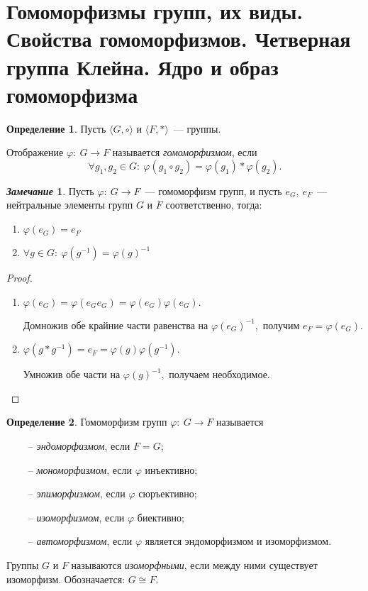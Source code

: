 \documentclass[a4paper, 14pt]{extarticle}
\newcommand{\n}{\par}
\renewcommand{\phi}{\varphi}
\theoremstyle{definition}
\newtheorem*{remark}{\textit{Замечание}}
\newtheorem{definition}{Определение}
\theoremstyle{plain}
\numberwithin{theorem}{section}
\numberwithin{definition}{section}
\numberwithin{statement}{section}
\numberwithin{lemma}{section}
\numberwithin{consequence}{section}
\begin{document}
	\section{Гомоморфизмы групп, их виды. Свойства гомоморфизмов. Четверная группа Клейна. Ядро и образ гомоморфизма}
	\setcounter{definition}{0}
	\begin{definition}
		Пусть $\langle G, \circ \rangle$ и $\langle F, * \rangle$~--- группы.
		\n
		Отображение $\phi{:} \ G \rightarrow F$ называется \textit{гомоморфизмом}, если
		\begin{equation*}
			\forall g_1, g_2 \in G{:} \ \phi(g_1 \circ g_2) = \phi(g_1) * \phi(g_2).
		\end{equation*}
	\end{definition}
	\begin{remark}
		Пусть ${\phi{:} \ G \rightarrow F}$~--- гомоморфизм групп, и пусть ${e_G, \ e_F}$~--- нейтральные элементы групп $G$ и $F$ соответственно, тогда:
		\begin{enumerate}
			\setlength\itemsep{0.1em}
			\item $\phi(e_G) = e_F$
			\item $\forall g \in G{:} \ \phi(g^{-1}) = \phi(g)^{-1}$
		\end{enumerate}
	\end{remark}
	\begin{proof}
		\
		\begin{enumerate}
			\setlength\itemsep{0.1em}
			\item $\phi(e_G) = \phi(e_Ge_G) = \phi(e_G)\phi(e_G).$ \n
			Домножив обе крайние части равенства на $\phi(e_G)^{-1},$ получим
			${e_F = \phi(e_G).}$
			\item $\phi(g * g^{-1}) = e_F = \phi(g)\phi(g^{-1}).$ \n
			Умножив обе части на $\phi(g)^{-1},$ получаем необходимое. \qedhere
		\end{enumerate}
	\end{proof}
	\begin{definition}
		Гомоморфизм групп ${\phi{:} \ G \rightarrow F}$ называется 
		\begin{itemize}
			\item [~--] \textit{эндоморфизмом}, если $F = G$;
			\item [~--] \textit{мономорфизмом}, если $\phi$ инъективно;
			\item [~--] \textit{эпиморфизмом}, если $\phi$ сюръективно;
			\item [~--] \textit{изоморфизмом}, если $\phi$ биективно;
			\item [~--] \textit{автоморфизмом}, если $\phi$ является эндоморфизмом и изоморфизмом.
		\end{itemize} \n
		Группы $G$ и $F$ называются \textit{изоморфными}, если между ними существует изоморфизм. Обозначается: $G \cong F.$
	\end{definition}
\end{document}
